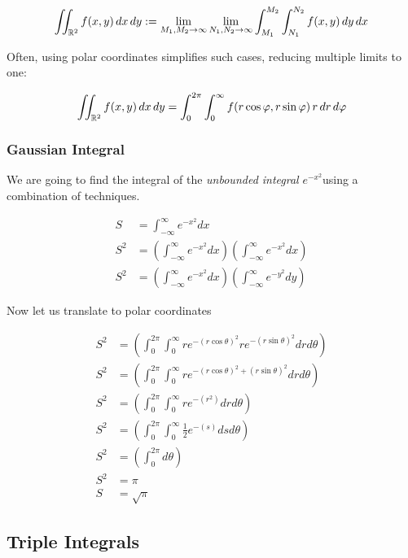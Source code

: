 \[
    \iint_{\mathbb{R}^2} f(x, y)\, dx\, dy := \lim_{M_1, M_2 \to \infty} \lim_{N_1, N_2 \to \infty}
    \int_{M_1}^{M_2} \int_{N_1}^{N_2} f(x, y)\, dy\, dx
\]

Often, using polar coordinates simplifies such cases, reducing multiple limits to one:

\[
    \iint_{\mathbb{R}^2} f(x, y)\, dx\, dy = \int_0^{2\pi} \int_0^{\infty} f(r \cos \varphi, r \sin \varphi)\, 
    r\, dr\, d\varphi
\]


\subsubsection{Gaussian Integral}

We are going to find the integral of the \emph{unbounded integral} 
\(e^{-x^2}\)using a combination of techniques.

\begin{align*}
    S &= \int_{-\infty}^{\infty} e^{-x^2}dx\\
    S^2 &= \left(\int_{-\infty}^{\infty} e^{-x^2}dx\right) \left(\int_{-\infty}^{\infty} e^{-x^2}dx\right)\\
    S^2 &= \left(\int_{-\infty}^{\infty} e^{-x^2}dx\right) \left(\int_{-\infty}^{\infty} e^{-y^2}dy\right)
\end{align*}

Now let us translate to polar coordinates

\begin{align*}
    S^2 &= \left(\int_{0}^{2\pi} \int_{0}^{\infty}re^{-{(r\cos\theta)}^2} re^{-{(r\sin\theta)}^2}drd\theta\right)\\
    S^2 &= \left(\int_{0}^{2\pi} \int_{0}^{\infty}re^{-{(r\cos\theta)}^2 + {(r\sin\theta)}^2}drd\theta\right)\\
    S^2 &= \left(\int_{0}^{2\pi} \int_{0}^{\infty}re^{-(r^2)}drd\theta\right)\\
    S^2 &=  \left(\int_{0}^{2\pi} \int_{0}^{\infty}\frac{1}{2}e^{-(s)}dsd\theta\right)\\
    S^2 &= \left(\int_{0}^{2\pi}d\theta\right)\\
    S^2 &= \pi\\
    S   &= \sqrt{\pi}
\end{align*}

\QED

\subsection{Triple Integrals}

